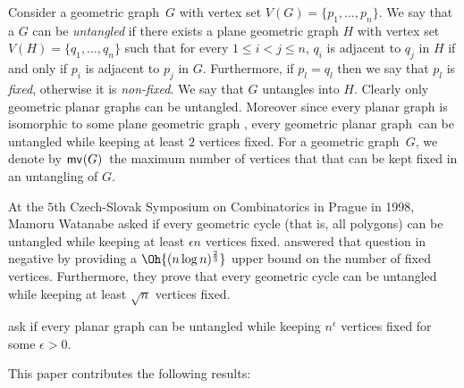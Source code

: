 \documentclass[lotsofwhite,charterfonts, letter]{patmorin}
\renewcommand{\gg}{geometric graph}
\newcommand{\gp}{geometric planar graph}
\newcommand{\go}{geometric outerplanar graph}
\newcommand{\gt}{geometric tree}
\newcommand{\gr}{geometric cubic $3$-connected planar graph}
\newcommand{\mv}[2][]{\ensuremath{\textup{\textsf{mv}}_{#1}(#2)}}
\begin{document}
Consider a \gg\ $G$ with vertex set $V(G)=\{p_1, \dots, p_n\}$. We say that a $G$ can be \emph{untangled} if there exists a plane geometric graph $H$ with vertex set $V(H)=\{q_1, \dots, q_n\}$ such that for every $1\leq i<j\leq n$, $q_i$ is adjacent to $q_j$ in $H$ if and only if $p_i$ is adjacent to $p_j$ in $G$. Furthermore, if $p_l=q_l$ then we say that $p_l$ is \emph{fixed}, otherwise it is \emph{non-fixed}. We say that $G$ untangles into $H$. Clearly only \gp s can be untangled. Moreover since every planar graph is isomorphic to some plane geometric graph \cite{Wagner37, Fary48}, every \gp\ can be untangled while keeping at least $2$ vertices fixed. For a \gg\ $G$, we denote by \mv{G}\ the maximum number of vertices that that can be kept fixed in an untangling of $G$.


At the $5$th Czech-Slovak Symposium on Combinatorics in Prague in 1998, Mamoru Watanabe asked if every geometric cycle (that is, all polygons) can be untangled while keeping at least $\epsilon n$ vertices fixed. \citet{PT} answered that question in negative by providing a $\Oh{(n\log n)^\frac{2}{3}}$ upper bound on the number of fixed vertices. Furthermore, they prove that every geometric cycle can be untangled while keeping at least $\sqrt{n}$ vertices fixed.


\citet{PT} ask if every planar graph can be untangled while keeping $n^\epsilon$ vertices fixed for some $\epsilon>0$. 





This paper contributes the following results:


\end{document}

